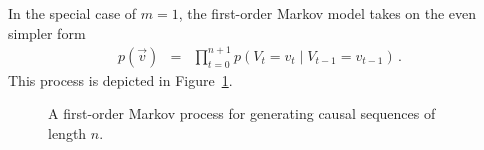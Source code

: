 \documentclass[a4paper]{article}
\begin{document}
In the special case of $m=1$, the first-order Markov model takes on the even simpler form
\begin{eqnarray}
p(\vec{v}) & = & \prod_{t=0}^{n+1}p(V_t=v_t\;|\;V_{t-1}=v_{t-1})\,.
\end{eqnarray}
This process is depicted in Figure~\ref{fig:markov-1-process}.
\begin{figure}[hbt]
\centering
{}
\caption{A first-order Markov process for generating causal sequences of length $n$.}
\label{fig:markov-1-process}
\end{figure}

\end{document}
